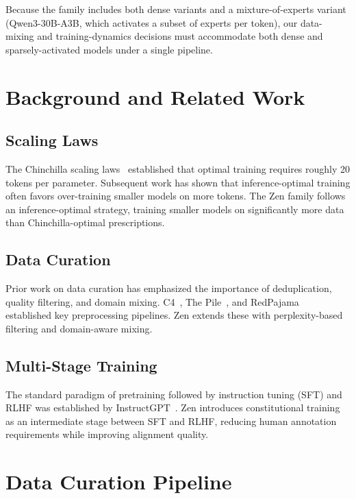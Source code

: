 \documentclass[11pt,a4paper]{article}
\begin{document}
Because the family includes both dense variants and a mixture-of-experts variant
(Qwen3-30B-A3B, which activates a subset of experts per token), our data-mixing and
training-dynamics decisions must accommodate both dense and sparsely-activated models
under a single pipeline.

\section{Background and Related Work}

\subsection{Scaling Laws}

The Chinchilla scaling laws~\cite{hoffmann2022chinchilla} established that optimal
training requires roughly 20 tokens per parameter. Subsequent work has shown that
inference-optimal training often favors over-training smaller models on more tokens.
The Zen family follows an inference-optimal strategy, training smaller models on
significantly more data than Chinchilla-optimal prescriptions.

\subsection{Data Curation}

Prior work on data curation has emphasized the importance of deduplication, quality
filtering, and domain mixing. C4~\cite{raffel2020c4}, The Pile~\cite{gao2021pile}, and
RedPajama~\cite{together2023redpajama} established key preprocessing pipelines. Zen
extends these with perplexity-based filtering and domain-aware mixing.

\subsection{Multi-Stage Training}

The standard paradigm of pretraining followed by instruction tuning (SFT) and RLHF
was established by InstructGPT~\cite{ouyang2022rlhf}. Zen introduces constitutional
training as an intermediate stage between SFT and RLHF, reducing human annotation
requirements while improving alignment quality.

\section{Data Curation Pipeline}
\end{document}
